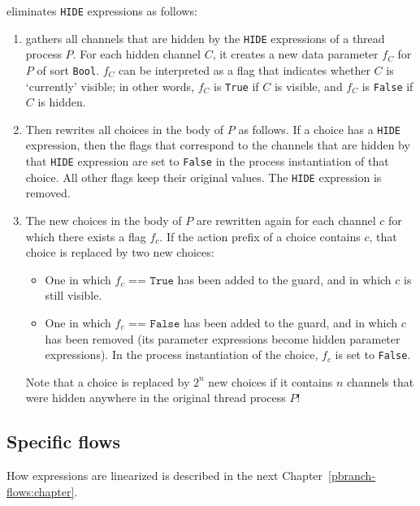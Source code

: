 \lpeq{} eliminates \texttt{HIDE} expressions as follows:
\begin{enumerate}[1.]
\item \lpeq{} gathers all channels that are hidden by the \texttt{HIDE} expressions of a thread process $P$.
For each hidden channel $C$, it creates a new data parameter $f_C$ for $P$ of sort \texttt{Bool}.
$f_C$ can be interpreted as a flag that indicates whether $C$ is `currently' visible; in other words, $f_C$ is \texttt{True} if $C$ is visible, and $f_C$ is \texttt{False} if $C$ is hidden.
\item Then \lpeq{} rewrites all choices in the body of $P$ as follows.
If a choice has a \texttt{HIDE} expression, then the flags that correspond to the channels that are hidden by that \texttt{HIDE} expression are set to \texttt{False} in the process instantiation of that choice.
All other flags keep their original values.
The \texttt{HIDE} expression is removed.
\item The new choices in the body of $P$ are rewritten again for each channel $c$ for which there exists a flag $f_c$.
If the action prefix of a choice contains $c$, that choice is replaced by two new choices:
\begin{itemize}
\item One in which $f_c \texttt{ == True}$ has been added to the guard, and in which $c$ is still visible.
\item One in which $f_c \texttt{ == False}$ has been added to the guard, and in which $c$ has been removed (its parameter expressions become hidden parameter expressions).
In the process instantiation of the choice, $f_c$ is set to \texttt{False}.
\end{itemize}
Note that a choice is replaced by $2^n$ new choices if it contains $n$ channels that were hidden anywhere in the original thread process $P$!
\end{enumerate}

\subsection{Specific flows}

How \pedi{} expressions are linearized is described in the next Chapter~\ref{pbranch-flows:chapter}.

